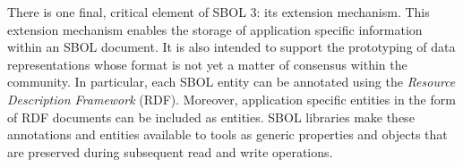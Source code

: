 There is one final, critical element of SBOL 3: its extension mechanism. This extension mechanism enables the storage of application specific information within an SBOL document. It is also intended to support the prototyping of data representations whose format is not yet a matter of consensus within the community. In particular, each SBOL entity can be annotated using the \emph{Resource Description Framework} (RDF). Moreover, application specific entities in the form of RDF documents can be included as  entities. SBOL libraries make these annotations and entities available to tools as generic properties and objects that are preserved during subsequent read and write operations.
